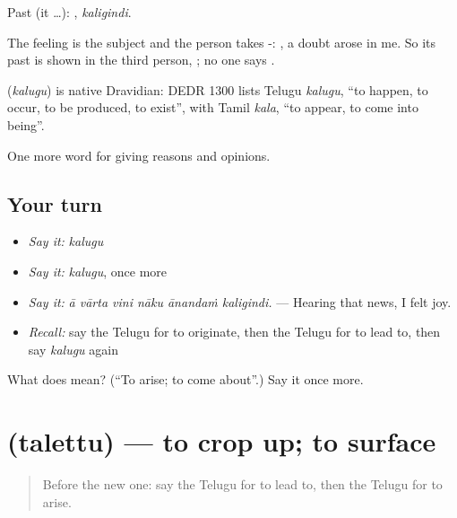 Past (it …): , \emph{kaligindi}.

The feeling is the subject and the person takes -:   , a doubt arose in me. So its past is shown in the third person, ; no one says .

\begin{cousinweb}
\textbf{} (\emph{kalugu}) is native Dravidian: DEDR 1300 lists Telugu \emph{kalugu}, \textquotedblleft{}to happen, to occur, to be produced, to exist\textquotedblright{}, with Tamil \emph{kala}, \textquotedblleft{}to appear, to come into being\textquotedblright{}.
\end{cousinweb}

\begin{grammarlens}[title={What you've built}]
One more word for giving reasons and opinions.
\end{grammarlens}

\subsection*{Your turn}
\begin{itemize}
\raggedright
  \item \emph{Say it:} \emph{kalugu}
  \item \emph{Say it:} \emph{kalugu}, once more
  \item \emph{Say it:} \emph{ā vārta vini nāku ānandaṁ kaligindi.} — Hearing that news, I felt joy.
  \item \emph{Recall:} say the Telugu for to originate, then the Telugu for to lead to, then say \emph{kalugu} again
\end{itemize}

\begin{tcolorbox}[breakable,colback=teal!4,colframe=teal!35!black,title={Before you move on}]
What does  mean? (\textquotedblleft{}To arise; to come about\textquotedblright{}.) Say it once more.
\end{tcolorbox}
\section[\texorpdfstring{\te{తలెత్తు} (talettu)}{తలెత్తు (talettu)}]{ (talettu) — to crop up; to surface}

\label{lesson:TE-C392-talettu}



\begin{quote}
Before the new one: say the Telugu for to lead to, then the Telugu for to arise.
\end{quote}

